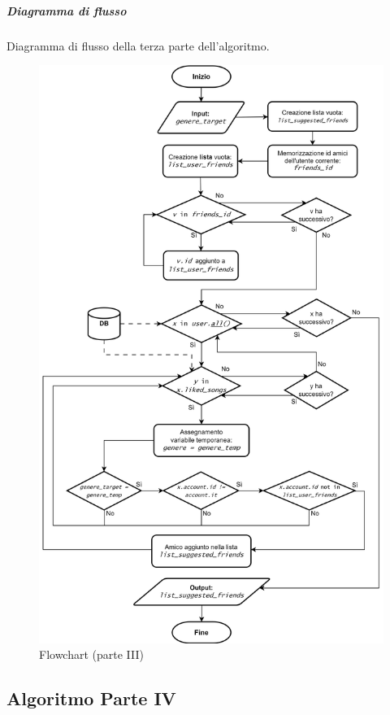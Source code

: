 \newpage
\subparagraph{Diagramma di flusso} 
Diagramma di flusso della terza parte dell'algoritmo.
\begin{figure} [H]
    \centering
    \includegraphics[scale=0.65]{images/flowchart-Parte III.png}
    \caption{Flowchart (parte III)}
    \label{fig-fc3}
\end{figure}


\newpage
\subsection{Algoritmo Parte IV}

